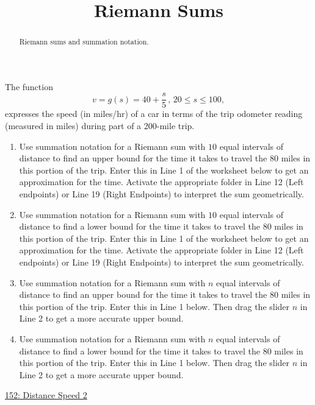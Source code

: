 \documentclass{ximera}
\title{Riemann Sums}
\begin{document}
\begin{abstract}
Riemann sums and summation notation.
\end{abstract}
\maketitle



\begin{question} \label{QPdfer34334}
The function
\[
   v = g(s) = 40 + \frac{s}{5} \, , \, 20\leq s \leq 100 ,
\]
expresses the speed (in miles/hr) of a car in terms of the trip odometer reading (measured in miles) during part of a 200-mile trip.

\begin{enumerate}
\item Use summation notation for a Riemann sum with $10$ equal intervals of distance to find an upper bound for the time it takes to travel the $80$ miles in this portion of the trip. Enter this in Line 1 of the worksheet below to get an approximation for the time. Activate the appropriate folder in Line 12 (Left endpoints) or Line 19 (Right Endpoints) to interpret the sum geometrically.

\item Use summation notation for a Riemann sum with $10$ equal intervals of distance to find a lower bound for the time it takes to travel the $80$ miles in this portion of the trip. Enter this in Line 1 of the worksheet below to get an  approximation for the time.
Activate the appropriate folder in Line 12 (Left endpoints) or Line 19 (Right Endpoints) to interpret the sum geometrically.

\item Use summation notation for a Riemann sum with $n$ equal intervals of distance to find an upper bound for the time it takes to travel the $80$ miles in this portion of the trip. Enter this in Line 1 below. Then drag the slider $n$ in Line 2 to get a more accurate upper bound.

\item Use summation notation for a Riemann sum with $n$ equal intervals of distance to find a lower bound for the time it takes to travel the $80$ miles in this portion of the trip. Enter this in Line 1 below. Then drag the slider $n$ in Line 2 to get a more accurate upper bound.


\end{enumerate}

\begin{onlineOnly}
    \begin{center}
\end{center}
\end{onlineOnly}
 
\href{https://www.desmos.com/calculator/k10phbukon}{152: Distance Speed 2}
\end{question}
\end{document}
